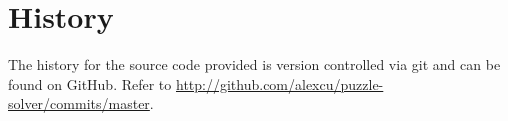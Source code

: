 \section{History}
\label{sec:History}

The history for the source code provided is version controlled via git and can
be found on GitHub. Refer to \url{http://github.com/alexcu/puzzle-solver/commits/master}.
